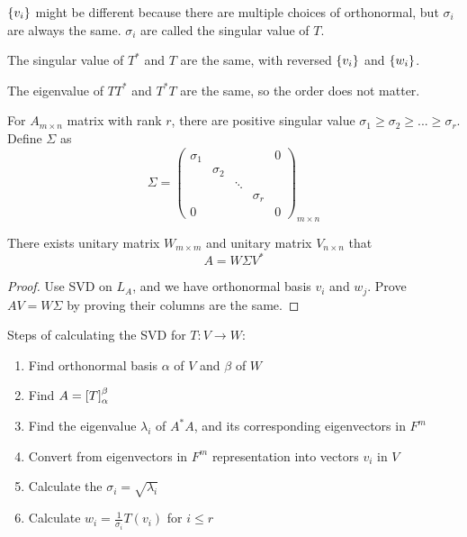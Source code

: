 \begin{definition}
    $\set{v_i}$ might be different because there are multiple choices of orthonormal, but $\sigma_i$ are always the same. $\sigma_i$ are called the singular value of $T$.
\end{definition}


The singular value of $T^*$ and $T$ are the same, with reversed $\set{v_i}$ and $\set{w_i}$.


The eigenvalue of $TT^*$ and $T^*T$ are the same, so the order does not matter.

\begin{theorem}
    For $A_{m \times n}$ matrix with rank $r$, there are positive singular value $\sigma_1 \geq \sigma_2 \geq ... \geq \sigma_r$. Define $\Sigma$ as
    \begin{equation}
        \Sigma = \begin{pmatrix}
            \sigma_1 & & & & 0 \\
             & \sigma_2 \\
             &  & \ddots &  \\
             &  &  &\sigma_r \\
            0 & & &  & 0
        \end{pmatrix}_{m \times n}
    \end{equation}
    
    There exists unitary matrix $W_{m \times m}$ and unitary matrix $V_{n \times n}$ that
    \begin{equation}
        A = W \Sigma V^*
    \end{equation}
\end{theorem}
\begin{proof}
    Use SVD on $L_A$, and we have orthonormal basis $v_i$ and $w_j$. Prove $AV = W \Sigma$ by proving their columns are the same.
\end{proof}

Steps of calculating the SVD for $T:V \rightarrow W$:
\begin{enumerate}
    \item Find orthonormal basis $\alpha$ of $V$ and $\beta$ of $W$
    \item Find $A = \coordinate{T}_\alpha^\beta$
    \item Find the eigenvalue $\lambda_i$ of $A^*A$, and its corresponding eigenvectors in $F^m$
    \item Convert from eigenvectors in $F^m$ representation into vectors $v_i$ in $V$
    \item Calculate the $\sigma_i = \sqrt{\lambda_i}$
    \item Calculate $\displaystyle w_i = \frac{1}{\sigma_i} T(v_i)$ for $i \leq r$
\end{enumerate}

